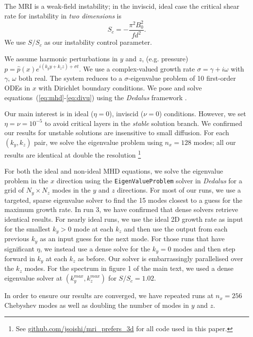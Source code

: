\documentclass[openacc]{rsproca_new}%
\newcommand{\SSC}{S/S_{c}}
\begin{document}
The MRI is a weak-field instability; in the inviscid, ideal case the critical shear rate for instability in \textit{two dimensions} is
\begin{equation}\label{eq:Sc}
  S_{c}=-\frac{\pi^{2}B_{0}^2}{fd^2}.
\end{equation}
We use $\SSC$ as our instability control parameter. 

We assume harmonic perturbations in $y$ and $z$, (e.g. pressure) $p=\hat{p}(x)e^{i(k_{y}y+k_{z}z)+\sigma{t}}$. 
We use a complex-valued growth rate $\sigma=\gamma+i\omega$ with $\gamma,\,\omega$ both real. 
The system reduces to a $\sigma$-eigenvalue problem of 10 first-order ODEs in $x$ with Dirichlet boundary conditions.
We pose and solve equations~(\ref{eq:mhd}-\ref{eq:divu}) using the \emph{Dedalus} framework \cite{2019arXiv190510388B}.

Our main interest is in ideal ($\eta=0$), inviscid ($\nu=0$) conditions.
However, we set $\eta=\nu=10^{-5}$ to avoid critical layers in the \textit{stable} solution branch.
We confirmed our results for unstable solutions are insensitive to small diffusion. 
For each $(k_{y},k_{z})$ pair, we solve the eigenvalue problem using $n_{x}=128$ modes; all our results are identical at double the resolution \footnote{See \protect\url{github.com/jsoishi/mri_prefers_3d} for all code used in this paper.}

For both the ideal and non-ideal MHD equations, we solve the eigenvalue problem in the $x$ direction using the \texttt{EigenValueProblem} solver in \emph{Dedalus} for a grid of $N_y \times N_z$ modes in the $y$ and $z$ directions.
For most of our runs, we use a targeted, sparse eigenvalue solver to find the 15 modes closest to a guess for the maximum growth rate.
In run 3, we have confirmed that dense solvers retrieve identical results.
For nearly ideal runs, we use the ideal 2D growth rate as input for the smallest $k_y > 0$ mode at each $k_z$ and then use the output from each previous $k_y$ as an input guess for the next mode.
For those runs that have significant $\eta$, we instead use a dense solve for the $k_y = 0$ modes and then step forward in $k_y$ at each $k_z$ as before.
Our solver is embarrassingly parallelised over the $k_z$ modes.
For the spectrum in figure 1 of the main text, we used a dense eigenvalue solver at $(k_y^{max},k_z^{max})$ for $\SSC= 1.02$.

In order to ensure our results are converged, we have repeated runs at $n_x=256$ Chebyshev modes as well as doubling the number of modes in $y$ and $z$.
\end{document}
